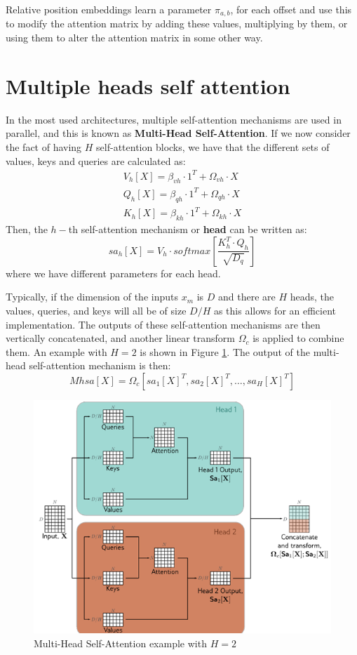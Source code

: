Relative position embeddings learn a parameter $\pi_{a, b}$, for each offset and
use this to modify the attention matrix by adding these values, multiplying by them,
or using them to alter the attention matrix in some other way.
\section{Multiple heads self attention}
In the most used architectures, multiple self-attention mechanisms are used in
parallel, and this is known as \textbf{Multi-Head Self-Attention}. If we now
consider the fact of having $H$ self-attention blocks, we have that the different
sets of values, keys and queries are calculated as:
\begin{align*}
    V_h[X] = \beta_{vh} \cdot 1^T + \Omega_{vh} \cdot X \\
    Q_h[X] = \beta_{qh} \cdot 1^T + \Omega_{qh} \cdot X \\
    K_h[X] = \beta_{kh} \cdot 1^T + \Omega_{kh} \cdot X
\end{align*}
Then, the $h-$th self-attention mechanism or \textbf{head} can be written as:
\begin{equation}
    sa_h[X] = V_h \cdot softmax\left[\frac{K_h^T \cdot Q_h}{\sqrt{D_q}}\right]
\end{equation}
where we have different parameters for each head.

Typically, if the dimension of the inputs $x_m$ is $D$ and there are $H$ heads,
the values, queries, and keys will all be of size $D / H$ as this allows for an
efficient implementation. The outputs of these self-attention mechanisms are then
vertically concatenated, and another linear transform $\Omega_c$ is applied to
combine them. An example with $H = 2$ is shown in Figure \ref{fig:multiHead}.
The output of the multi-head self-attention mechanism is then:
\begin{equation}
    Mhsa[X] = \Omega_c[sa_1[X]^T, sa_2[X]^T, \dots, sa_H[X]^T]
\end{equation}
\begin{figure}[!ht]
    \centering
    \includegraphics[width=0.5\linewidth]{img/transformer/multihead.png}
    \caption{Multi-Head Self-Attention example with $H = 2$}
    \label{fig:multiHead}
\end{figure}

